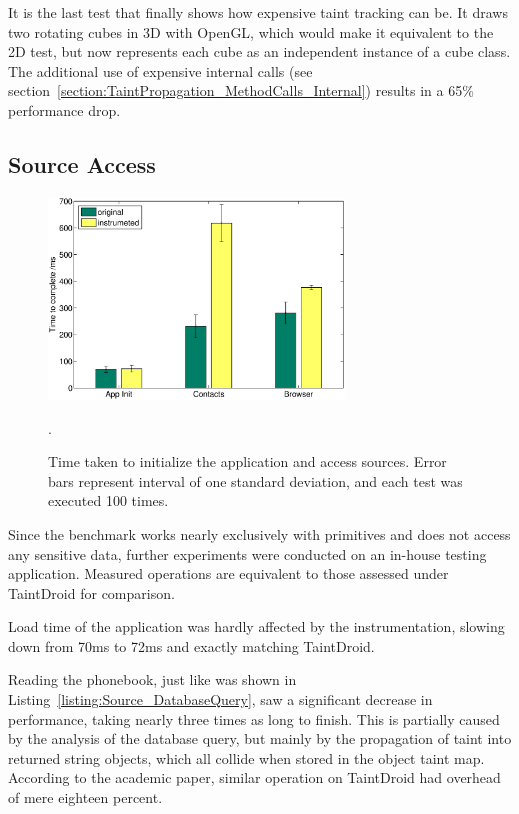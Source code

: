 \documentclass[12pt,twoside,notitlepage]{report}
\begin{document}
It is the last test that finally shows how expensive taint tracking can be. It draws two rotating cubes in 3D with OpenGL, which would make it equivalent to the 2D test, but now represents each cube as an independent instance of a cube class. The additional use of expensive internal calls (see section~\ref{section:TaintPropagation_MethodCalls_Internal}) results in a 65\% performance drop.

\subsection{Source Access}

\begin{figure}
	\centerline{	
		\includegraphics[width=0.7\textwidth]{figs/fig_eval_testappbench.eps}
	}
	\caption{Time taken to initialize the application and access sources. Error bars represent interval of one standard deviation, and each test was executed 100 times.}.
	\label{figure:Evalutaion_TestAppBench}
\end{figure}

Since the benchmark works nearly exclusively with primitives and does not access any sensitive data, further experiments were conducted on an in-house testing application. Measured operations are equivalent to those assessed under TaintDroid for comparison. 

Load time of the application was hardly affected by the instrumentation, slowing down from 70ms to 72ms and exactly matching TaintDroid. 

Reading the phonebook, just like was shown in Listing~\ref{listing:Source_DatabaseQuery}, saw a significant decrease in performance, taking nearly three times as long to finish. This is partially caused by the analysis of the database query, but mainly by the propagation of taint into returned string objects, which all collide when stored in the object taint map. According to the academic paper, similar operation on TaintDroid had overhead of mere eighteen percent. 
\end{document}
